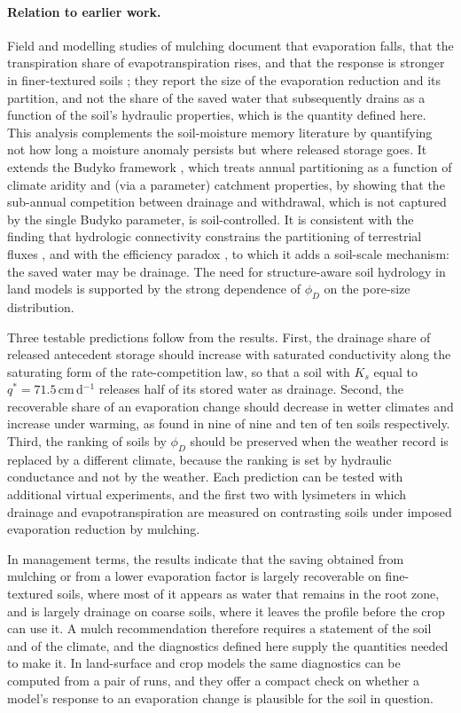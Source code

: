 \paragraph{Relation to earlier work.}
Field and modelling studies of mulching document that evaporation falls, that the transpiration share of evapotranspiration rises, and that the response is stronger in finer-textured soils \citep{Zheng2021,Kang2024}; they report the size of the evaporation reduction and its partition, and not the share of the saved water that subsequently drains as a function of the soil's hydraulic properties, which is the quantity defined here. This analysis complements the soil-moisture memory literature \citep{Koster2001,Seneviratne2010} by quantifying not how long a moisture anomaly persists but where released storage goes. It extends the Budyko framework \citep{Budyko1974,Milly1994}, which treats annual partitioning as a function of climate aridity and (via a parameter) catchment properties, by showing that the sub-annual competition between drainage and withdrawal, which is not captured by the single Budyko parameter, is soil-controlled. It is consistent with the finding that hydrologic connectivity constrains the partitioning of terrestrial fluxes \citep{Good2015}, and with the efficiency paradox \citep{Grafton2018,Ward2008}, to which it adds a soil-scale mechanism: the saved water may be drainage. The need for structure-aware soil hydrology in land models \citep{Fatichi2020,Vereecken2016,Vereecken2019} is supported by the strong dependence of $\phi_D$ on the pore-size distribution.


Three testable predictions follow from the results. First, the drainage share of released antecedent storage should increase with saturated conductivity along the saturating form of the rate-competition law, so that a soil with $K_s$ equal to $q^{*}=71.5$\,cm\,d$^{-1}$ releases half of its stored water as drainage. Second, the recoverable share of an evaporation change should decrease in wetter climates and increase under warming, as found in nine of nine and ten of ten soils respectively. Third, the ranking of soils by $\phi_D$ should be preserved when the weather record is replaced by a different climate, because the ranking is set by hydraulic conductance and not by the weather. Each prediction can be tested with additional virtual experiments, and the first two with lysimeters in which drainage and evapotranspiration are measured on contrasting soils under imposed evaporation reduction by mulching.

In management terms, the results indicate that the saving obtained from mulching or from a lower evaporation factor is largely recoverable on fine-textured soils, where most of it appears as water that remains in the root zone, and is largely drainage on coarse soils, where it leaves the profile before the crop can use it. A mulch recommendation therefore requires a statement of the soil and of the climate, and the diagnostics defined here supply the quantities needed to make it. In land-surface and crop models the same diagnostics can be computed from a pair of runs, and they offer a compact check on whether a model's response to an evaporation change is plausible for the soil in question.


